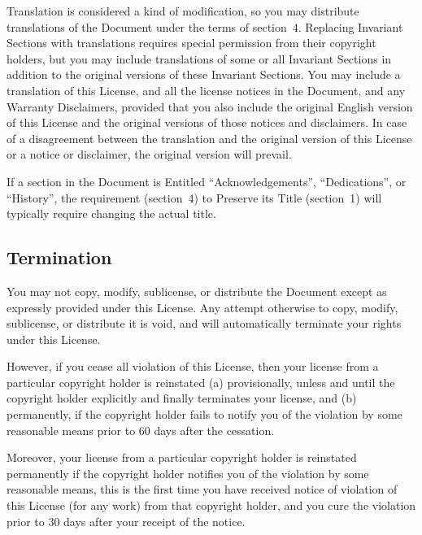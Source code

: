 \documentclass[letterpaper,twoside]{scrartcl}
\begin{document}
   Translation is considered a kind of modification, so you may
   distribute translations of the Document under the terms of section~4.
   Replacing Invariant Sections with translations requires special
   permission from their copyright holders, but you may include
   translations of some or all Invariant Sections in addition to the
   original versions of these Invariant Sections.  You may include a
   translation of this License, and all the license notices in the
   Document, and any Warranty Disclaimers, provided that you also include
   the original English version of this License and the original versions
   of those notices and disclaimers.  In case of a disagreement between
   the translation and the original version of this License or a notice
   or disclaimer, the original version will prevail.

   If a section in the Document is Entitled ``Acknowledgements'',
   ``Dedications'', or ``History'', the requirement (section~4) to Preserve
   its Title (section~1) will typically require changing the actual
   title.


   
   
   \subsection{Termination}
   


   You may not copy, modify, sublicense, or distribute the Document
   except as expressly provided under this License.  Any attempt
   otherwise to copy, modify, sublicense, or distribute it is void, and
   will automatically terminate your rights under this License.

   However, if you cease all violation of this License, then your license
   from a particular copyright holder is reinstated (a) provisionally,
   unless and until the copyright holder explicitly and finally
   terminates your license, and (b) permanently, if the copyright holder
   fails to notify you of the violation by some reasonable means prior to
   60 days after the cessation.

   Moreover, your license from a particular copyright holder is
   reinstated permanently if the copyright holder notifies you of the
   violation by some reasonable means, this is the first time you have
   received notice of violation of this License (for any work) from that
   copyright holder, and you cure the violation prior to 30 days after
   your receipt of the notice.
\end{document}
